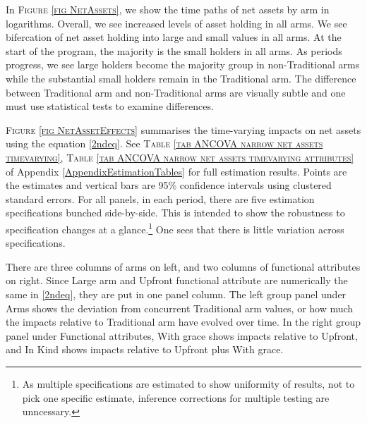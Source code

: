 	In \textsc{\footnotesize Figure \ref{fig NetAssets}}, we show the time paths of net assets by arm in logarithms. Overall, we see increased levels of asset holding in all arms. We see bifercation of net asset holding into large and small values in all arms. At the start of the program, the majority is the small holders in all arms. As periods progress, we see large holders become the majority group in non-\textsf{Traditional} arms while the substantial small holders remain in the \textsf{Traditional} arm. The difference between \textsf{Traditional} arm and non-\textsf{Traditional} arms are visually subtle and one must use statistical tests to examine differences. %

	\textsc{\footnotesize Figure \ref{fig NetAssetEffects}} summarises the time-varying impacts on net assets using the equation \eqref{2ndeq}.  See \textsc{\footnotesize Table \ref{tab ANCOVA narrow net assets timevarying}}, \textsc{\footnotesize Table \ref{tab ANCOVA narrow net assets timevarying attributes}} of Appendix \ref{AppendixEstimationTables} for full estimation results. Points are the estimates and vertical bars are 95\% confidence intervals using clustered standard errors. For all panels, in each period, there are five estimation specifications bunched side-by-side. This is intended to show the robustness to specification changes at a glance.\footnote{As multiple specifications are estimated to show uniformity of results, not to pick one specific estimate, inference corrections for multiple testing are unncessary. } One sees that there is little variation across specifications. %
	
	There are three columns of arms on left, and two columns of functional attributes on right. Since \textsf{Large} arm and \textsf{Upfront} functional attribute are numerically the same in \eqref{2ndeq}, they are put in one panel column. The left group panel under \textsf{Arms} shows the deviation from concurrent \textsf{Traditional} arm values, or how much the impacts relative to \textsf{Traditional} arm have evolved over time. In the right group panel under \textsf{Functional attributes}, \textsf{With grace} shows impacts relative to \textsf{Upfront}, and \textsf{In Kind} shows impacts relative to \textsf{Upfront} plus \textsf{With grace}. 

